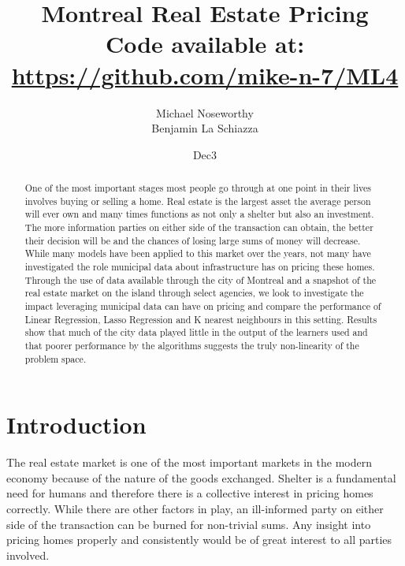 \documentclass{acm_proc_article-sp}
\begin{document}
\title{Montreal Real Estate Pricing \\
{\normalsize Code available at: \url{https://github.com/mike-n-7/ML4}}} 
\subtitle{}

\author{
\alignauthor 
Michael Noseworthy \\
\alignauthor Benjamin La Schiazza\\
}

\date{Dec3}

\maketitle
\begin{abstract}
	One of the most important stages most people go through at one point in their lives involves buying or selling a home.  Real estate is the largest asset the average person will ever own and many times functions as not only a shelter but also an investment. The more information parties on either side of the transaction can obtain, the better their decision will be and the chances of losing large sums of money will decrease. While many models have been applied to this market over the years, not many have investigated the role municipal data about infrastructure has on pricing these homes. Through the use of data available through the city of Montreal and a snapshot of the real estate market on the island through select agencies, we look to investigate the impact leveraging municipal data can have on pricing and compare the performance of Linear Regression, Lasso Regression and K nearest neighbours in this setting. Results show that much of the city data played little in the output of the learners used and that poorer performance by the algorithms suggests the truly non-linearity of the problem space.

\end{abstract}

\section{Introduction}

	The real estate market is one of the most important markets in the modern economy because of the nature of the goods exchanged. Shelter is a fundamental need for humans and therefore there is a collective interest in pricing homes correctly. While there are other factors in play, an ill-informed party on either side of the transaction can be burned for non-trivial sums. Any insight into pricing homes properly and consistently would be of great interest to all parties involved. 
	
\end{document}
